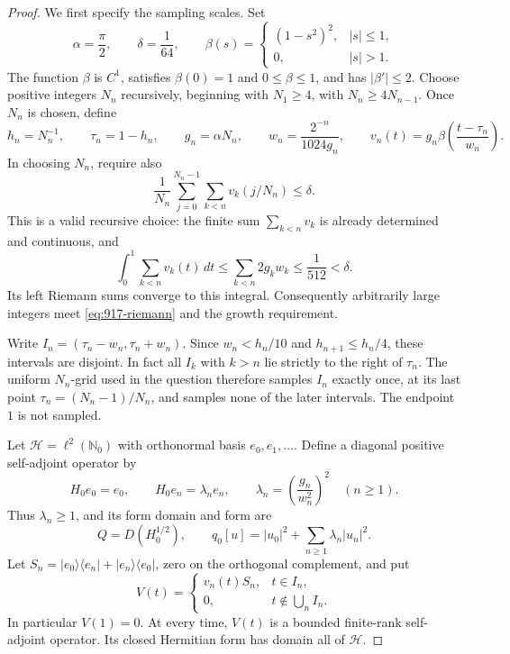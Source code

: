 \documentclass[11pt,a4paper]{article}
\theoremstyle{remark}
\begin{document}
\begin{proof}
We first specify the sampling scales. Set
\[
 \alpha=\frac\pi2,\qquad \delta=\frac1{64},\qquad
 \beta(s)=\begin{cases}(1-s^2)^2,&|s|\le1,\\0,&|s|>1.\end{cases}
\]
The function $\beta$ is $C^1$, satisfies $\beta(0)=1$ and
$0\le\beta\le1$, and has $|\beta'|\le2$. Choose positive integers $N_n$
recursively, beginning with $N_1\ge4$, with $N_n\ge4N_{n-1}$. Once $N_n$
is chosen, define
\[
 h_n=N_n^{-1},\qquad \tau_n=1-h_n,\qquad g_n=\alpha N_n,
 \qquad w_n=\frac{2^{-n}}{1024g_n},
 \qquad v_n(t)=g_n\beta\!\left(\frac{t-\tau_n}{w_n}\right).
\]
In choosing $N_n$, require also
\begin{equation}\label{eq:917-riemann}
 \frac1{N_n}\sum_{j=0}^{N_n-1}\sum_{k<n}v_k(j/N_n)\le\delta.
\end{equation}
This is a valid recursive choice: the finite sum $\sum_{k<n}v_k$ is
already determined and continuous, and
\[
 \int_0^1\sum_{k<n}v_k(t)\,dt
 \le\sum_{k<n}2g_kw_k
 \le\frac1{512}<\delta.
\]
Its left Riemann sums converge to this integral. Consequently arbitrarily
large integers meet \eqref{eq:917-riemann} and the growth requirement.

Write $I_n=(\tau_n-w_n,\tau_n+w_n)$. Since $w_n<h_n/10$ and
$h_{n+1}\le h_n/4$, these intervals are disjoint. In fact all $I_k$ with
$k>n$ lie strictly to the right of $\tau_n$. The uniform $N_n$-grid used
in the question therefore samples $I_n$ exactly once, at its last point
$\tau_n=(N_n-1)/N_n$, and samples none of the later intervals. The endpoint
$1$ is not sampled.

Let $\mathcal H=\ell^2(\mathbb N_0)$ with orthonormal basis
$e_0,e_1,\ldots$. Define a diagonal positive self-adjoint operator by
\[
 H_0e_0=e_0,\qquad H_0e_n=\lambda_ne_n,
 \qquad \lambda_n=\left(\frac{g_n}{w_n^2}\right)^2\quad(n\ge1).
\]
Thus $\lambda_n\ge1$, and its form domain and form are
\[
 Q=D(H_0^{1/2}),\qquad
 q_0[u]=|u_0|^2+\sum_{n\ge1}\lambda_n|u_n|^2.
\]
Let $S_n=|e_0\rangle\langle e_n|+|e_n\rangle\langle e_0|$, zero on the
orthogonal complement, and put
\[
 V(t)=\begin{cases}v_n(t)S_n,&t\in I_n,\\0,&t\notin\bigcup_n I_n.
 \end{cases}
\]
In particular $V(1)=0$. At every time, $V(t)$ is a bounded finite-rank
self-adjoint operator. Its closed Hermitian form has domain all of
$\mathcal H$.


\end{proof}
\end{document}
